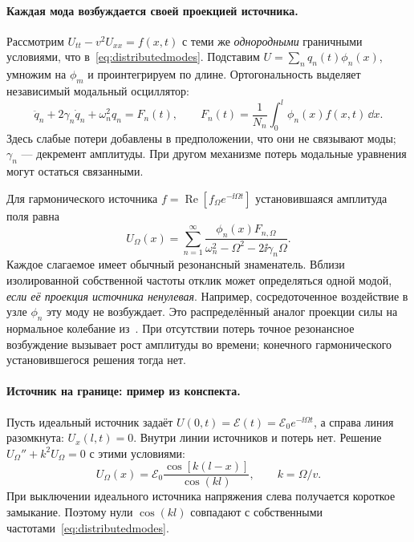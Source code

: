 \paragraph{Каждая мода возбуждается своей проекцией источника.}
Рассмотрим $U_{tt}-v^2U_{xx}=f(x,t)$ с теми же \emph{однородными} граничными условиями, что в~\eqref{eq:distributedmodes}. Подставим $U=\sum_nq_n(t)\phi_n(x)$, умножим на $\phi_m$ и проинтегрируем по длине. Ортогональность выделяет независимый модальный осциллятор:
\begin{equation}
 \ddot q_n+2\gamma_n\dot q_n+\omega_n^2q_n=F_n(t),\qquad
 F_n(t)=\frac1{N_n}\int_0^l\phi_n(x)f(x,t)\,\dd x.
\end{equation}
Здесь слабые потери добавлены в предположении, что они не связывают моды; $\gamma_n$ --- декремент амплитуды. При другом механизме потерь модальные уравнения могут остаться связанными.

Для гармонического источника $f=\operatorname{Re}[f_\Omega e^{-\ii\Omega t}]$ установившаяся амплитуда поля равна
\begin{equation}\label{eq:distributedForced}
 U_\Omega(x)=\sum_{n=1}^{\infty}
 \frac{\phi_n(x)F_{n,\Omega}}
 {\omega_n^2-\Omega^2-2\ii\gamma_n\Omega}.
\end{equation}
Каждое слагаемое имеет обычный резонансный знаменатель. Вблизи изолированной собственной частоты отклик может определяться одной модой, \emph{если её проекция источника ненулевая}. Например, сосредоточенное воздействие в узле $\phi_n$ эту моду не возбуждает. Это распределённый аналог проекции силы на нормальное колебание из~. При отсутствии потерь точное резонансное возбуждение вызывает рост амплитуды во времени; конечного гармонического установившегося решения тогда нет.

\paragraph{Источник на границе: пример из конспекта.}
Пусть идеальный источник задаёт $U(0,t)=\mathcal E(t)=\mathcal E_0e^{-\ii\Omega t}$, а справа линия разомкнута: $U_x(l,t)=0$. Внутри линии источников и потерь нет. Решение $U_\Omega''+k^2U_\Omega=0$ с этими условиями:
\begin{equation}
 U_\Omega(x)=\mathcal E_0\frac{\cos[k(l-x)]}{\cos(kl)},
 \qquad k=\Omega/v.
\end{equation}
При выключении идеального источника напряжения слева получается короткое замыкание. Поэтому нули $\cos(kl)$ совпадают с собственными частотами~\eqref{eq:distributedmodes}.

